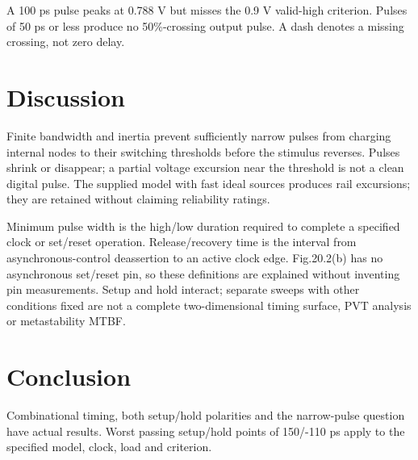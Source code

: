 A 100 ps pulse peaks at 0.788 V but misses the 0.9 V valid-high criterion. Pulses of 50 ps or less produce no 50\%-crossing output pulse. A dash denotes a missing crossing, not zero delay.

\section{Discussion}
Finite bandwidth and inertia prevent sufficiently narrow pulses from charging internal nodes to their switching thresholds before the stimulus reverses. Pulses shrink or disappear; a partial voltage excursion near the threshold is not a clean digital pulse. The supplied model with fast ideal sources produces rail excursions; they are retained without claiming reliability ratings.

Minimum pulse width is the high/low duration required to complete a specified clock or set/reset operation. Release/recovery time is the interval from asynchronous-control deassertion to an active clock edge. Fig.20.2(b) has no asynchronous set/reset pin, so these definitions are explained without inventing pin measurements. Setup and hold interact; separate sweeps with other conditions fixed are not a complete two-dimensional timing surface, PVT analysis or metastability MTBF.

\section{Conclusion}
Combinational timing, both setup/hold polarities and the narrow-pulse question have actual results. Worst passing setup/hold points of 150/-110 ps apply to the specified model, clock, load and criterion.
